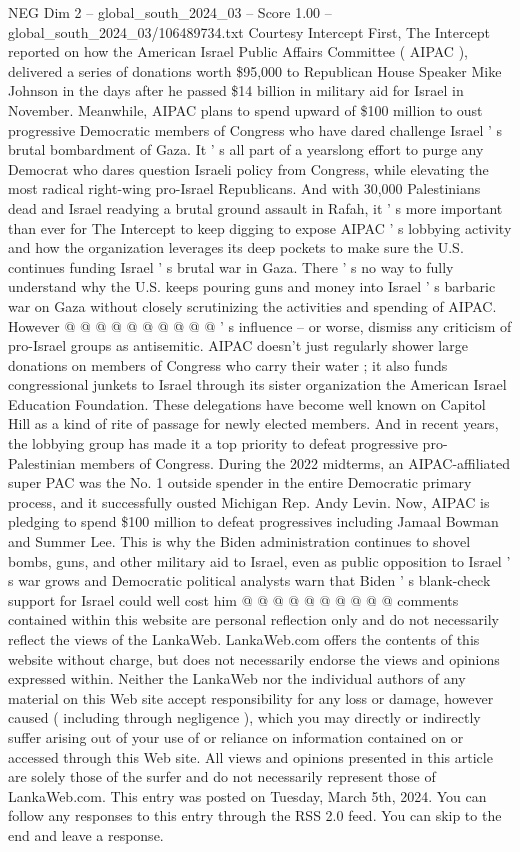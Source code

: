 \begin{textsample}{NEG Dim 2 – global\_south\_2024\_03 – Score 1.00 – global\_south\_2024\_03/106489734.txt}  \label{ex:f2_neg_111}
Courtesy Intercept First, The Intercept reported on how the American Israel Public Affairs Committee ( AIPAC ), delivered a series of donations worth \$95,000 to Republican House Speaker Mike Johnson in the days after he passed \$14 billion in military aid for Israel in November.
Meanwhile, AIPAC plans to spend upward of \$100 million to oust progressive Democratic members of Congress who have dared challenge Israel ' s brutal bombardment of Gaza.
It ' s all part of a yearslong effort to purge any Democrat who dares question Israeli policy from Congress, while elevating the most radical right-wing pro-Israel Republicans.
And with 30,000 Palestinians dead and Israel readying a brutal ground assault in Rafah, it ' s more important than ever for The Intercept to keep digging to expose AIPAC ' s lobbying activity and how the organization leverages its deep pockets to make sure the U.S. continues funding Israel ' s brutal war in Gaza.
There ' s no way to fully understand why the U.S. keeps pouring guns and money into Israel ' s barbaric war on Gaza without closely scrutinizing the activities and spending of AIPAC.
However @ @ @ @ @ @ @ @ @ @ ' s influence -- or worse, dismiss any criticism of pro-Israel groups as antisemitic.
AIPAC doesn't just regularly shower large donations on members of Congress who carry their water ; it also funds congressional junkets to Israel through its sister organization the American Israel Education Foundation.
These delegations have become well known on Capitol Hill as a kind of rite of passage for newly elected members.
And in recent years, the lobbying group has made it a top priority to defeat progressive pro-Palestinian members of Congress.
During the 2022 midterms, an AIPAC-affiliated super PAC was the No. 1 outside spender in the entire Democratic primary process, and it successfully ousted Michigan Rep.
Andy Levin.
Now, AIPAC is pledging to spend \$100 million to defeat progressives including Jamaal Bowman and Summer Lee.
This is why the Biden administration continues to shovel bombs, guns, and other military aid to Israel, even as public opposition to Israel ' s war grows and Democratic political analysts warn that Biden ' s blank-check support for Israel could well cost him @ @ @ @ @ @ @ @ @ @ comments contained within this website are personal reflection only and do not necessarily reflect the views of the LankaWeb.
LankaWeb.com offers the contents of this website without charge, but does not necessarily endorse the views and opinions expressed within.
Neither the LankaWeb nor the individual authors of any material on this Web site accept responsibility for any loss or damage, however caused ( including through negligence ), which you may directly or indirectly suffer arising out of your use of or reliance on information contained on or accessed through this Web site.
All views and opinions presented in this article are solely those of the surfer and do not necessarily represent those of LankaWeb.com.
This entry was posted on Tuesday, March 5th, 2024.
You can follow any responses to this entry through the RSS 2.0 feed.
You can skip to the end and leave a response.

\end{textsample}
